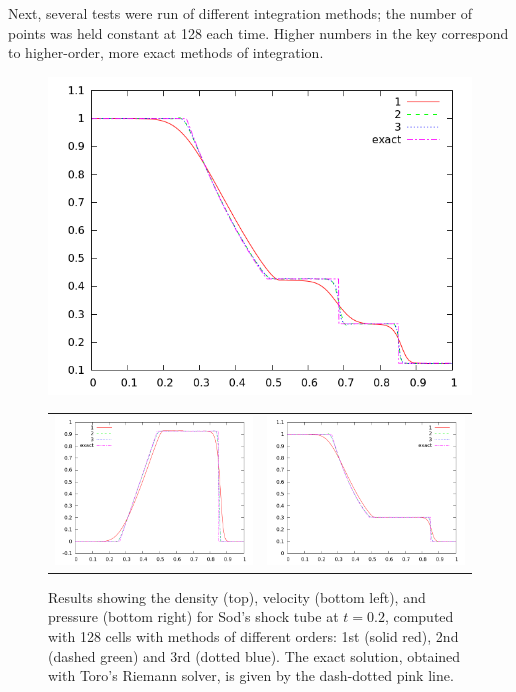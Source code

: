 \documentclass[10pt]{article}
\begin{document}
Next, several tests were run of different integration methods; the number of points was held constant at 128 each time. Higher numbers in the key correspond to higher-order, more exact methods of integration. 

\begin{figure}[h]
  \begin{center}
    \includegraphics[width=.975\textwidth]{den128comp_20}
    \begin{tabular}{cc}
      \includegraphics[width=.475\textwidth]{vel128comp_20} &
      \includegraphics[width=.475\textwidth]{prs128comp_20}
    \end{tabular}
  \end{center}
  \caption{Results showing the density (top), velocity (bottom left), and pressure (bottom right) for Sod's shock tube at $t=0.2$, computed with 128 cells with methods of different orders: 1st (solid red), 2nd (dashed green) and 3rd (dotted blue). The exact solution, obtained with Toro's Riemann solver, is given by the dash-dotted pink line.}
  \label{fig:den128comp}
\end{figure}
\end{document}

